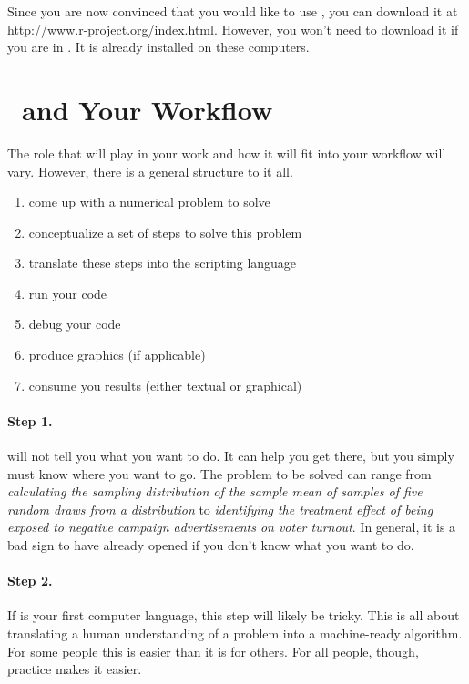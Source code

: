 Since you are now convinced that you would like to use \R{}, you can
download it at \url{http://www.r-project.org/index.html}. However, you
won't need to download it if you are in \tsl{}. It is
already installed on these computers.

\section{\R~and Your Workflow}

The role that \R{} will play in your work and how it will fit into your
workflow will vary. However, there is a general structure to it all.

\begin{enumerate}
\item come up with a numerical problem to solve
\item conceptualize a set of steps to solve this problem
\item translate these steps into the \R{} scripting language
\item run your \R{} code
\item debug your \R{} code
\item produce graphics (if applicable)
\item consume you results (either textual or graphical)
\end{enumerate}

\paragraph{Step 1.} \R{} will not tell you what you want to do. It can
help you get there, but you simply must know where you want to go. The
problem to be solved can range from \textit{calculating the sampling
  distribution of the sample mean of samples of five random draws from
  a distribution} to \textit{identifying the treatment effect of being exposed
to negative campaign advertisements on voter turnout}. In general, it
is a bad sign to have already opened \R{} if you don't know what you
want to do.

\paragraph{Step 2.} If \R{} is your first computer language, this step
will likely be tricky. This is all about translating a
human understanding of a problem into a machine-ready algorithm. For
some people this is easier than it is for others. For all people,
though, practice makes it easier.

